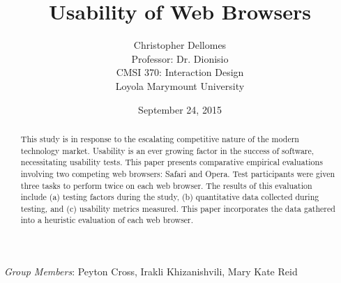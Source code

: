 \documentclass{article}
\begin{document}
\title{Usability of Web Browsers}
\author{Christopher Dellomes\\
Professor: Dr. Dionisio\\
CMSI 370: Interaction Design\\
	Loyola Marymount University}

\date{September 24, 2015}

\maketitle

\begin{center}
\begin{abstract}
\noindent This study is in response to the escalating competitive nature of the modern technology market. Usability is an ever growing factor in the success of software, necessitating usability tests. This paper presents comparative empirical evaluations involving two competing web browsers: Safari and Opera. Test participants were given three tasks to perform twice on each web browser. The results of this evaluation include (a) testing factors during the study, (b) quantitative data collected during testing, and (c) usability metrics measured. This paper incorporates the data gathered into a heuristic evaluation of each web browser.
\end{abstract}


\bigskip

\textit{Group Members}: Peyton Cross, Irakli Khizanishvili, Mary Kate Reid
\end{center}

\thispagestyle{empty}

\clearpage

\setcounter{page}{1}
\end{document}
